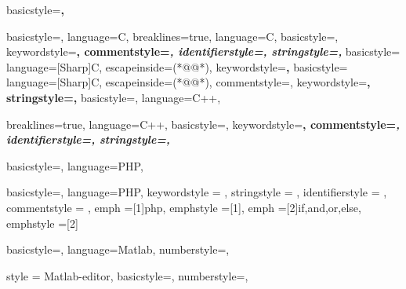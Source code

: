 
	{
	basicstyle=\scriptsize\bf\ttfamily,
	}
   
	{
	basicstyle=\scriptsize,
	language=C,
	}
	{
  	breaklines=true,
  	language=C,
  	basicstyle=\scriptsize,
  	keywordstyle=\bfseries\color{green!40!black},
  	commentstyle=\itshape\color{purple!40!black},
  	identifierstyle=\color{blue},
  	stringstyle=\color{orange},
    }
	{
	basicstyle=\scriptsize
	language=[Sharp]C,
	escapeinside={(*@}{@*)},
	keywordstyle=\bfseries,
	}
	{
	basicstyle=\scriptsize
	language=[Sharp]C,
	escapeinside={(*@}{@*)},
	commentstyle=\color{greencomments},
	keywordstyle=\color{bluekeywords}\bfseries,
	stringstyle=\color{redstrings},
	}
	{
	basicstyle=\scriptsize,
	language=C++,
 	}
 	
	{
  	breaklines=true,
  	language=C++,
  	basicstyle=\scriptsize,
  	keywordstyle=\bfseries\color{green!40!black},
  	commentstyle=\itshape\color{purple!40!black},
  	identifierstyle=\color{blue},
  	stringstyle=\color{orange},
    }
    
	{
	basicstyle=\scriptsize,
	language=PHP,
	}
	
	{
	basicstyle=\scriptsize,
	language=PHP,
	keywordstyle    = \color{dkblue},
  	stringstyle     = \color{red},
  	identifierstyle = \color{dkgreen},
  	commentstyle    = \color{gray},
  	emph            =[1]{php},
  	emphstyle       =[1]\color{black},
  	emph            =[2]{if,and,or,else},
  	emphstyle       =[2]\color{dkyellow}
  }
  
	{
	basicstyle=\scriptsize,
	language=Matlab,
	numberstyle=\tiny\ttfamily\color{gray75},
	}
	
	{
	style = Matlab-editor,
	basicstyle=\scriptsize,
	numberstyle=\tiny\ttfamily\color{gray75},
	}
	

